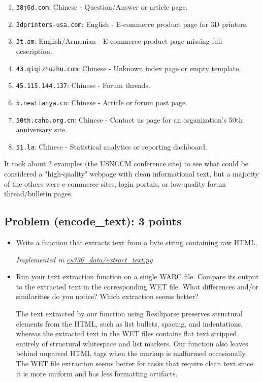 \documentclass[letterpaper]{article}
\begin{document}
\begin{itemize}
\begin{enumerate}
		\item \texttt{38j6d.com}: Chinese - Question/Answer or article page.
		\item \texttt{3dprinters-usa.com}: English - E-commerce product page for 3D printers.
		\item \texttt{3t.am}: English/Armenian - E-commerce product page missing full description.
		\item \texttt{43.qiqizhuzhu.com}: Chinese - Unknown index page or empty template.
		\item \texttt{45.115.144.137}: Chinese - Forum threads.
		\item \texttt{5.newtianya.cn}: Chinese - Article or forum post page.
		\item \texttt{50th.cahb.org.cn}: Chinese - Contact us page for an organization's 50th anniversary site.
		\item \texttt{51.la}: Chinese - Statistical analytics or reporting dashboard.
	\end{enumerate}

	\vspace{1em}
	\noindent It took about 2 examples (the USNCCM conference site) to see what could be considered a "high-quality" webpage with clean informational text, but a majority of the others were e-commerce sites, login portals, or low-quality forum thread/bulletin pages.

\end{itemize}

\subsection{Problem (encode\_text): 3 points}

\begin{itemize}
	\item[(a)] Write a function that extracts text from a byte string containing raw HTML.

	\textit{Implemented in  \href{https://github.com/echung32/ece405-assignment2-data/blob/main/cs336_data/extract_text.py}{cs336\_data/extract\_text.py}}

	\item[(b)] Run your text extraction function on a single WARC file. Compare its output to the extracted text in the corresponding WET file. What differences and/or similarities do you notice? Which extraction seems better?

	The text extracted by our function using Resiliparse preserves structural elements from the HTML, such as list bullets, spacing, and indentations, whereas the extracted text in the WET files contains flat text stripped entirely of structural whitespace and list markers. Our function also leaves behind unparsed HTML tags when the markup is malformed occasionally. The WET file extraction seems better for tasks that require clean text since it is more uniform and has less formatting artifacts.

\end{itemize}
\end{document}
